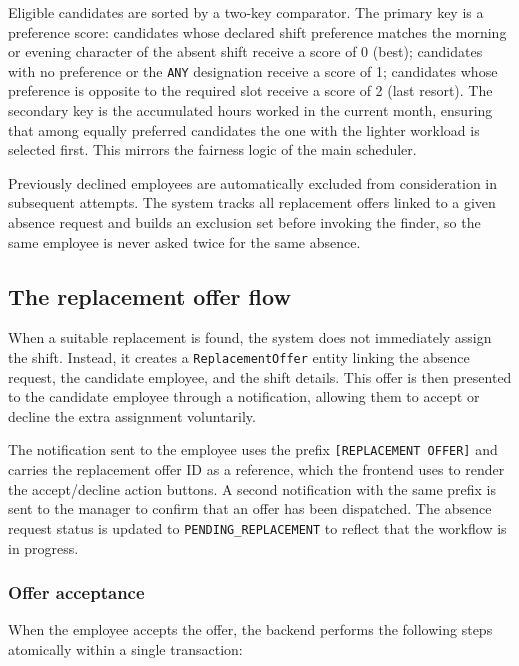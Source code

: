 \par Eligible candidates are sorted by a two-key comparator. The primary key is a preference score: candidates whose declared shift preference matches the morning or evening character of the absent shift receive a score of 0 (best); candidates with no preference or the \texttt{ANY} designation receive a score of 1; candidates whose preference is opposite to the required slot receive a score of 2 (last resort). The secondary key is the accumulated hours worked in the current month, ensuring that among equally preferred candidates the one with the lighter workload is selected first. This mirrors the fairness logic of the main scheduler.

\par Previously declined employees are automatically excluded from consideration in subsequent attempts. The system tracks all replacement offers linked to a given absence request and builds an exclusion set before invoking the finder, so the same employee is never asked twice for the same absence.

\subsection{The replacement offer flow}
\par When a suitable replacement is found, the system does not immediately assign the shift. Instead, it creates a \texttt{ReplacementOffer} entity linking the absence request, the candidate employee, and the shift details. This offer is then presented to the candidate employee through a notification, allowing them to accept or decline the extra assignment voluntarily.

\par The notification sent to the employee uses the prefix \texttt{[REPLACEMENT OFFER]} and carries the replacement offer ID as a reference, which the frontend uses to render the accept/decline action buttons. A second notification with the same prefix is sent to the manager to confirm that an offer has been dispatched. The absence request status is updated to \texttt{PENDING\_REPLACEMENT} to reflect that the workflow is in progress.

\subsubsection*{Offer acceptance}
\par When the employee accepts the offer, the backend performs the following steps atomically within a single transaction:

